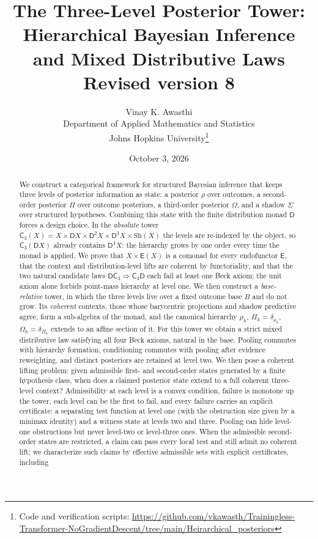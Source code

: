 \documentclass[11pt]{article}
\title{The Three-Level Posterior Tower:\\
Hierarchical Bayesian Inference and Mixed Distributive Laws\\[4pt]
\large Revised version 8}
\author{Vinay K. Awasthi\\
Department of Applied Mathematics and Statistics\\
Johns Hopkins University\thanks{Code and verification scripts:
\url{https://github.com/vkawasth/Trainingless-Transformer-NoGradientDescent/tree/main/Heirarchical_posteriors}}}
\date{October 3, 2026}
\theoremstyle{definition}
\theoremstyle{remark}
\newcommand{\D}{\mathsf{D}}
\newcommand{\Sh}{\mathrm{Sh}}
\newcommand{\C}{\mathsf{C}}
\newcommand{\E}{\mathsf{E}}
\begin{document}
\maketitle

\begin{abstract}
We construct a categorical framework for structured Bayesian inference that keeps three levels of
posterior information as state: a posterior $\rho$ over outcomes, a second-order posterior $\Pi$ over
outcome posteriors, a third-order posterior $\Omega$, and a shadow $\Sigma$ over structured hypotheses.
Combining this state with the finite distribution monad $\D$ forces a design choice. In the
\emph{absolute} tower $\C_3(X)=X\times\D X\times\D^2X\times\D^3X\times\Sh(X)$ the levels are
re-indexed by the object, so $\C_3(\D X)$ already contains $\D^4X$: the hierarchy grows by one order
every time the monad is applied. We prove that $X\times\E(X)$ is a comonad for every endofunctor $\E$,
that the context and distribution-level lifts are coherent by functoriality, and that the two natural
candidate laws $\D\C_3\Rightarrow\C_3\D$ each fail at least one Beck axiom; the unit axiom alone forbids
point-mass hierarchy at level one. We then construct a \emph{base-relative} tower, in which the three
levels live over a fixed outcome base $B$ and do not grow. Its \emph{coherent} contexts, those whose
barycentric projections and shadow predictive agree, form a sub-algebra of the monad, and the
canonical hierarchy $\rho_h$, $\Pi_h=\delta_{\rho_h}$, $\Omega_h=\delta_{\Pi_h}$ extends to an affine
section of it. For this tower we obtain a strict mixed distributive law satisfying all four Beck
axioms, natural in the base. Pooling commutes with hierarchy formation, conditioning commutes with
pooling after evidence reweighting, and distinct posteriors are retained at level two. We then pose a coherent lifting problem: given
admissible first- and second-order states generated by a finite hypothesis class, when does a claimed
posterior state extend to a full coherent three-level context? Admissibility at each level is a
convex condition, failure is monotone up the tower, each level can be the first to fail, and every
failure carries an explicit certificate: a separating test function at level one (with the obstruction
size given by a minimax identity) and a witness state at levels two and three. Pooling can hide
level-one obstructions but never level-two or level-three ones. When the admissible second-order
states are restricted, a claim can pass every local test and still admit no coherent lift; we
characterize such claims by effective admissible sets with explicit certificates, including

\end{abstract}
\end{document}
